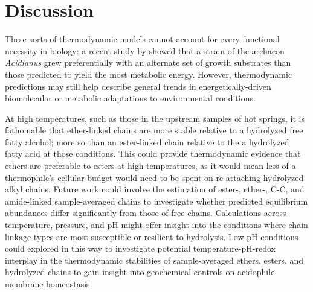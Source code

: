 \section{Discussion}



These sorts of thermodynamic models cannot account for every functional necessity in biology; a recent study by \cite{amenabar2017microbial} showed that a strain of the archaeon \textit{Acidianus} grew preferentially with an alternate set of growth substrates than those predicted to yield the most metabolic energy. However, thermodynamic predictions may still help describe general trends in energetically-driven biomolecular or metabolic adaptations to environmental conditions.




At high temperatures, such as those in the upstream samples of hot springs, it is fathomable that ether-linked chains are more stable relative to a hydrolyzed free fatty alcohol; more so than an ester-linked chain relative to the a hydrolyzed fatty acid at those conditions. This could provide thermodynamic evidence that ethers are preferable to esters at high temperatures, as it would mean less of a thermophile's cellular budget would need to be spent on re-attaching hydrolyzed alkyl chains. Future work could involve the estimation of ester-, ether-, C-C, and amide-linked sample-averaged chains to investigate whether predicted equilibrium abundances differ significantly from those of free chains. Calculations across temperature, pressure, and pH might offer insight into the conditions where chain linkage types are most susceptible or resilient to hydrolysis. Low-pH conditions could explored in this way to investigate potential temperature-pH-redox interplay in the thermodynamic stabilities of sample-averaged ethers, esters, and hydrolyzed chains to gain insight into geochemical controls on acidophile membrane homeostasis.
